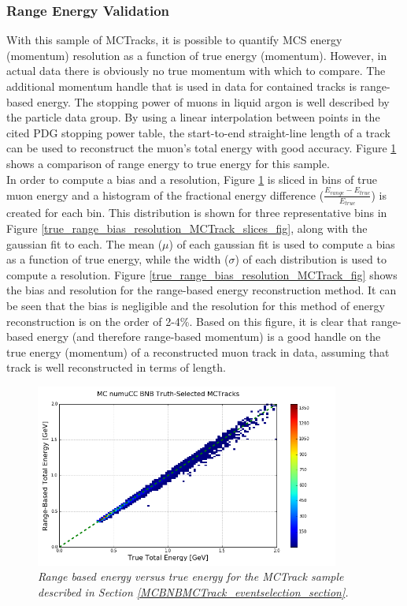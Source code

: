 \subsubsection{Range Energy Validation}\label{Range_Energy_Validation_section}
With this sample of {\sc MCTracks}, it is possible to quantify MCS energy (momentum) resolution as a function of true energy (momentum). However, in actual {\ub} data there is obviously no true momentum with which to compare. The additional momentum handle that is used in data for contained tracks is range-based energy. The stopping power of muons in liquid argon is well described by the particle data group\cite{PDG_spline_table}. By using a linear interpolation between points in the cited PDG stopping power table, the start-to-end straight-line length of a track can be used to reconstruct the muon's total energy with good accuracy. Figure \ref{true_range_energy_MCTrack_fig} shows a comparison of range energy to true energy for this sample. \\

In order to compute a bias and a resolution, Figure \ref{true_range_energy_MCTrack_fig} is sliced in bins of true muon energy and a histogram of the fractional energy difference ($\frac{E_{range} - E_{true}}{E_{true}}$) is created for each bin. This distribution is shown for three representative bins in Figure \ref{true_range_bias_resolution_MCTrack_slices_fig}, along with the gaussian fit to each.  The mean ($\mu$) of each gaussian fit is used to compute a bias as a function of true energy, while the width ($\sigma$) of each distribution is used to compute a resolution. Figure \ref{true_range_bias_resolution_MCTrack_fig} shows the bias and resolution for the range-based energy reconstruction method. It can be seen that the bias is negligible and the resolution for this method of energy reconstruction is on the order of 2-4\%. Based on this figure, it is clear that range-based energy (and therefore range-based momentum) is a good handle on the true energy (momentum) of a reconstructed muon track in {\ub} data, assuming that track is well reconstructed in terms of length.

\begin{figure}[ht!]
\begin{center}
\includegraphics[width=100mm]{Figures/true_range_comparison_MCTracks.png}
\end{center}
\caption{\textit{Range based energy versus true energy for the {\sc MCTrack} sample described in Section \ref{MCBNBMCTrack_eventselection_section}.}}
\label{true_range_energy_MCTrack_fig}
\end{figure}

